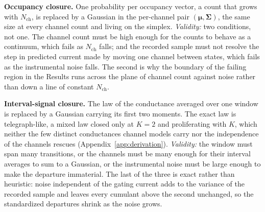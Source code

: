 \begin{tcolorbox}[title={The two Gaussian approximations}, colback=gray!5, colframe=gray!55]
\textbf{Occupancy closure.} One probability per occupancy vector, a count that grows with
$N_{\mathrm{ch}}$, is replaced by a Gaussian in the per-channel pair $(\bm{\mu},\bm{\Sigma})$, the
same size at every channel count and living on the simplex.
\emph{Validity:} two conditions, not one. The channel count must be high enough for the counts to
behave as a continuum, which fails as $N_{\mathrm{ch}}$ falls; and the recorded sample must not
resolve the step in predicted current made by moving one channel between states, which fails as
the instrumental noise falls. The second is why the boundary of the failing region in the Results
runs across the plane of channel count against noise rather than down a line of constant
$N_{\mathrm{ch}}$.

\smallskip
\textbf{Interval-signal closure.} The law of the conductance averaged over one window is replaced
by a Gaussian carrying its first two moments. The exact law is telegraph-like, a mixed law closed
only at $K=2$ and proliferating with $K$, which neither the few distinct conductances channel
models carry nor the independence of the channels rescues (Appendix~\ref{app:derivation}).
\emph{Validity:} the window must span many transitions, or the channels must be many enough for
their interval averages to sum to a Gaussian, or the instrumental noise must be large
enough to make the departure immaterial. The last of the three is exact rather than heuristic: noise
independent of the gating current adds to the variance of the recorded sample and leaves every
cumulant above the second unchanged, so the standardized departures shrink as the noise grows.


\end{tcolorbox}
